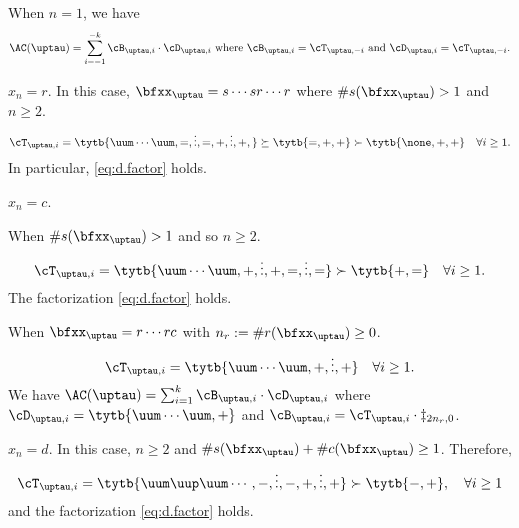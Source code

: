 \documentclass[ssunip]{subfiles}
\begin{document}
{\begin{enumT}
    When $n=1$, we have
    \begin{equation}\label{eq:gd.ss}
      \oAC{\uptau} = \sum_{i=-1}^{-k}\cB_{\uptau,i}\cdot \cD_{\uptau,i}
      \text{ where } \cB_{\uptau,i}=\cT_{\uptau,-i}
      \text{ and }\cD_{\uptau,i}=\cT_{\uptau,-i}.
  \end{equation}
  \item $x_{n} = r$.
    In this case, $\bfxx_{\uptau}= s\cdots sr\cdots r$ where
    $\#s(\bfxx_{\uptau})>1$ and $n\geq 2$.
   \[
     \cT_{\uptau,i}  = \tytb{\uum\cdots\uum,=,\vdots,=,+,\vdots,+,} \succeq \tytb{=,+,+}\succ\tytb{\none,+,+}
     \quad \forall i\geq 1.
   \]
   In particular, \eqref{eq:d.factor} holds.
   \item $x_{n} = c$.
   \begin{enumT}
     \item
     When $\#s(\bfxx_{\uptau})>1$ and so $n\geq 2$.
     \[
       \cT_{\uptau,i}  = \tytb{\uum\cdots\uum,+,\vdots,+,=,\vdots,=} \succ \tytb{+,=}
     \quad \forall i\geq 1.
     \]
     The factorization \eqref{eq:d.factor} holds.
     \item
     When $\bfxx_{\uptau}=r\cdots rc$ with $n_{r}:=\#r(\bfxx_{\uptau}) \geq 0$.
     \[
       \cT_{\uptau,i}  = \tytb{\uum\cdots\uum,+,\vdots,+} %
       \quad \forall i\geq 1.
     \]
     We have $\oAC{\uptau} = \sum_{i=1}^{k}\cB_{\uptau,i}\cdot \cD_{\uptau,i}$  where $\cD_{\uptau,i} = \tytb{\uum\cdots\uum,+}$ and
     $\cB_{\uptau,i} = \cT_{\uptau,i}\cdot \ddagger_{2n_{r},0}$.
   \end{enumT}
   \item $x_{n} = d$. In this case, $n\geq 2$ and
   $\#s(\bfxx_{\uptau})+\#c(\bfxx_{\uptau})\geq 1$. Therefore,
    \begin{equation}\label{eq:ss.c}
      \cT_{\uptau,i} = \tytb{\uum\uup\uum\cdots,-,\vdots,-,+,\vdots,+}\succ \tytb{-,+}, \quad \forall i\geq 1
    \end{equation}
    and the factorization \eqref{eq:d.factor} holds.
  \end{enumT}

}
\end{document}
